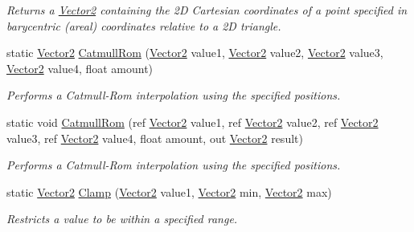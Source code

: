\begin{DoxyCompactItemize}
\begin{DoxyCompactList}\small\item\em Returns a \hyperlink{structMicrosoft_1_1Xna_1_1Framework_1_1Vector2}{Vector2} containing the 2\+D Cartesian coordinates of a point specified in barycentric (areal) coordinates relative to a 2\+D triangle.\end{DoxyCompactList}\item 
static \hyperlink{structMicrosoft_1_1Xna_1_1Framework_1_1Vector2}{Vector2} \hyperlink{structMicrosoft_1_1Xna_1_1Framework_1_1Vector2_ae0652ba249c5812047672475bc9594a1}{Catmull\+Rom} (\hyperlink{structMicrosoft_1_1Xna_1_1Framework_1_1Vector2}{Vector2} value1, \hyperlink{structMicrosoft_1_1Xna_1_1Framework_1_1Vector2}{Vector2} value2, \hyperlink{structMicrosoft_1_1Xna_1_1Framework_1_1Vector2}{Vector2} value3, \hyperlink{structMicrosoft_1_1Xna_1_1Framework_1_1Vector2}{Vector2} value4, float amount)
\begin{DoxyCompactList}\small\item\em Performs a Catmull-\/\+Rom interpolation using the specified positions.\end{DoxyCompactList}\item 
static void \hyperlink{structMicrosoft_1_1Xna_1_1Framework_1_1Vector2_a9d638b8be8ab8b422aa38a5646e6005b}{Catmull\+Rom} (ref \hyperlink{structMicrosoft_1_1Xna_1_1Framework_1_1Vector2}{Vector2} value1, ref \hyperlink{structMicrosoft_1_1Xna_1_1Framework_1_1Vector2}{Vector2} value2, ref \hyperlink{structMicrosoft_1_1Xna_1_1Framework_1_1Vector2}{Vector2} value3, ref \hyperlink{structMicrosoft_1_1Xna_1_1Framework_1_1Vector2}{Vector2} value4, float amount, out \hyperlink{structMicrosoft_1_1Xna_1_1Framework_1_1Vector2}{Vector2} result)
\begin{DoxyCompactList}\small\item\em Performs a Catmull-\/\+Rom interpolation using the specified positions.\end{DoxyCompactList}\item 
static \hyperlink{structMicrosoft_1_1Xna_1_1Framework_1_1Vector2}{Vector2} \hyperlink{structMicrosoft_1_1Xna_1_1Framework_1_1Vector2_aacdc6f7a1e2b2aad7be0c23372671a86}{Clamp} (\hyperlink{structMicrosoft_1_1Xna_1_1Framework_1_1Vector2}{Vector2} value1, \hyperlink{structMicrosoft_1_1Xna_1_1Framework_1_1Vector2}{Vector2} min, \hyperlink{structMicrosoft_1_1Xna_1_1Framework_1_1Vector2}{Vector2} max)
\begin{DoxyCompactList}\small\item\em Restricts a value to be within a specified range.\end{DoxyCompactList}\item 

\end{DoxyCompactItemize}
